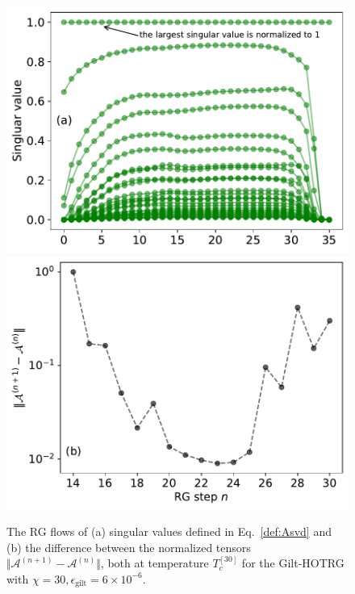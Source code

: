 \documentclass[aps,prb,reprint,superscriptaddress,floatfix]{revtex4-2}
\begin{document}
\begin{figure}[htb]
    \includegraphics[width=\columnwidth]{./figures/flowA-singVal.pdf}
    \includegraphics[width=\columnwidth]{./figures/flowA-diff.pdf}
    \caption{\label{fig:flowA}The RG flows of (a) singular values defined in
        Eq.~\eqref{def:Asvd} and (b) the difference between the normalized
tensors $\Vert \mathcal{A}^{(n+1)} - \mathcal{A}^{(n)} \Vert$, both at
temperature $T_c^{[30]}$ for the Gilt-HOTRG with $\chi = 30,
\epsilon_{\text{gilt}} = 6\times 10^{-6}$.}
\end{figure}
%
\end{document}
